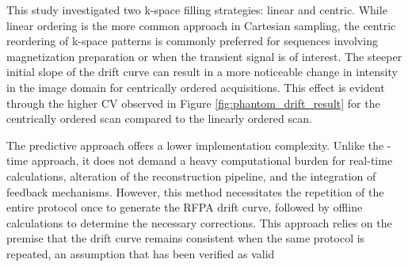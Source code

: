 This study investigated two k-space filling strategies: linear and centric. While linear ordering is the more common approach in Cartesian sampling, the centric reordering of k-space patterns is commonly preferred for sequences involving magnetization preparation or when the transient signal is of interest. \cite{bosch2023optimized, zaiss2018snapshot, worters2010balanced} The steeper initial slope of the drift curve can result in a more noticeable change in intensity in the image domain for centrically ordered acquisitions. This effect is evident through the higher CV observed in Figure \ref{fig:phantom_drift_result} for the centrically ordered scan compared to the linearly ordered scan.


The predictive approach offers a lower implementation complexity. Unlike the -time approach, it does not demand a heavy computational burden for real-time calculations, alteration of the reconstruction pipeline, and the integration of feedback mechanisms. However, this method necessitates the repetition of the entire protocol once to generate the RFPA drift curve, followed by offline calculations to determine the necessary corrections. This approach relies on the premise that the drift curve remains consistent when the same protocol is repeated, an assumption that has been verified as valid  



